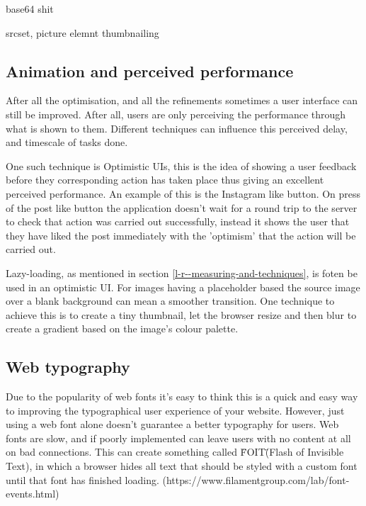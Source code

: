base64 shit

srcset, picture elemnt thumbnailing

\subsection{Animation and perceived performance}

After all the optimisation, and all the refinements sometimes a user interface can still be improved. After all, users are only perceiving the performance through what is shown to them. Different techniques can influence this perceived delay, and timescale of tasks done.

One such technique is Optimistic UIs, this is the idea of showing a user feedback before they corresponding action has taken place thus giving an excellent perceived performance. An example of this is the Instagram like button. On press of the post like button the application doesn't wait for a round trip to the server to check that action was carried out successfully, instead it shows the user that they have liked the post immediately with the 'optimism' that the action will be carried out.

Lazy-loading, as mentioned in section \ref{l-r--measuring-and-techniques}, is foten be used in an optimistic UI. For images having a placeholder based the source image over a blank background can mean a smoother transition. One technique to achieve this is to create a tiny thumbnail, let the browser resize and then blur to create a gradient based on the image's colour palette.
\cite{image_colours_lazy_loading}


\subsection{Web typography}

Due to the popularity of web fonts it's easy to think this is a quick and easy way to improving the typographical user experience of your website. However, just using a web font alone doesn't guarantee a better typography for users. Web fonts are slow, and if poorly implemented can leave users with no content at all on bad connections. This can create something called \"FOIT\" (Flash of Invisible Text), in which a browser hides all text that should be styled with a custom font until that font has finished loading. (https://www.filamentgroup.com/lab/font-events.html)

